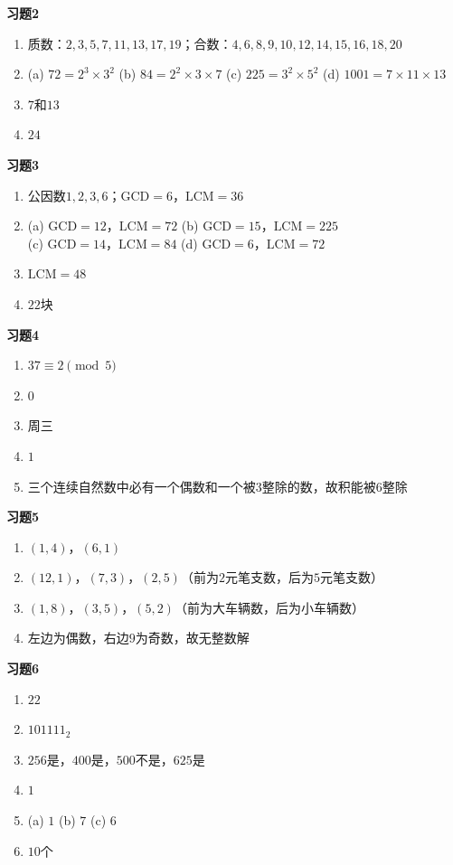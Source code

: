 \documentclass[a4paper,12pt]{ctexart}
\begin{document}
\textbf{习题2}
\begin{enumerate}
\item 质数：$2,3,5,7,11,13,17,19$；合数：$4,6,8,9,10,12,14,15,16,18,20$
\item[(2)] (a) $72=2^3\times3^2$ \qquad (b) $84=2^2\times3\times7$ \qquad (c) $225=3^2\times5^2$ \qquad (d) $1001=7\times11\times13$
\item $7$和$13$
\item $24$
\end{enumerate}

\textbf{习题3}
\begin{enumerate}
\item 公因数$1,2,3,6$；$\text{GCD}=6$，$\text{LCM}=36$
\item[(2)] (a) $\text{GCD}=12$，$\text{LCM}=72$ \qquad (b) $\text{GCD}=15$，$\text{LCM}=225$ \\ \qquad (c) $\text{GCD}=14$，$\text{LCM}=84$ \qquad (d) $\text{GCD}=6$，$\text{LCM}=72$
\item $\text{LCM}=48$
\item $22$块
\end{enumerate}

\textbf{习题4}
\begin{enumerate}
\item $37\equiv2\pmod5$
\item $0$
\item 周三
\item $1$
\item 三个连续自然数中必有一个偶数和一个被$3$整除的数，故积能被$6$整除
\end{enumerate}

\textbf{习题5}
\begin{enumerate}
\item $(1,4)$，$(6,1)$
\item $(12,1)$，$(7,3)$，$(2,5)$（前为$2$元笔支数，后为$5$元笔支数）
\item $(1,8)$，$(3,5)$，$(5,2)$（前为大车辆数，后为小车辆数）
\item 左边为偶数，右边$9$为奇数，故无整数解
\end{enumerate}

\textbf{习题6}
\begin{enumerate}
\item $22$
\item $101111_2$
\item $256$是，$400$是，$500$不是，$625$是
\item $1$
\item[(5)] (a) $1$ \qquad (b) $7$ \qquad (c) $6$
\item $10$个
\end{enumerate}
\end{document}
